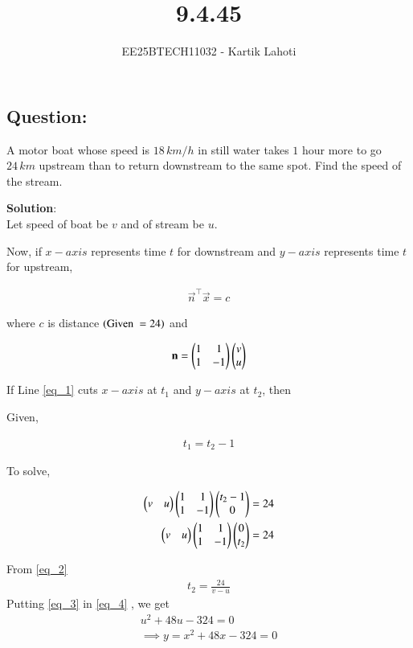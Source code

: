 \documentclass[journal]{IEEEtran}
\numberwithin{equation}{enumi}
\numberwithin{figure}{enumi}
\begin{document}

\vspace{3cm}

\title{9.4.45}
\author{EE25BTECH11032 - Kartik Lahoti}
\maketitle

\subsection*{Question: } 

A motor boat whose speed is $18 \,km/h$ in still water takes $1$ hour more to go $24\,km$ upstream than to return downstream to the same spot. Find the speed of the stream.

\textbf{Solution}:\\

Let speed of boat be $v$ and of stream be $u$. 

Now, if $x-axis$ represents time $t$ for downstream and $y-axis$ represents time $t$ for upstream, 

\begin{align}
    \vec{n}^{\top}\vec{x} = c \label{eq_1}
\end{align}

where $c$ is distance $\left(\text{Given }=24\right)$ and

\begin{align}
    \mathbf{n} = \begin{pmatrix}1 & 1\\ 1 & -1\end{pmatrix}\begin{pmatrix}v \\ u\end{pmatrix}
\end{align}

If Line \ref{eq_1} cuts $x-axis$ at $t_1$ and $y-axis$ at $t_2$, then 

Given,

\begin{align}
    t_1 = t_2 - 1
\end{align}

To solve, 

\begin{align}
    \begin{pmatrix}v & u\end{pmatrix}\begin{pmatrix}1&1\\1&-1\end{pmatrix}\begin{pmatrix}t_2-1\\0\end{pmatrix} &= 24 \label{eq_4} \\
    \begin{pmatrix}v & u\end{pmatrix}\begin{pmatrix}1&1\\1&-1\end{pmatrix}\begin{pmatrix}0\\t_2\end{pmatrix} &= 24  \label{eq_2}
\end{align}

From \ref{eq_2}
\begin{align}
    t_2 = \frac{24}{v-u} \label{eq_3}
\end{align}
Putting \ref{eq_3} in \ref{eq_4} , we get
\begin{align}
    u^2 + 48u - 324 = 0 \\
    \implies y = x^2 + 48x - 324 = 0 
\end{align}
\end{document}
